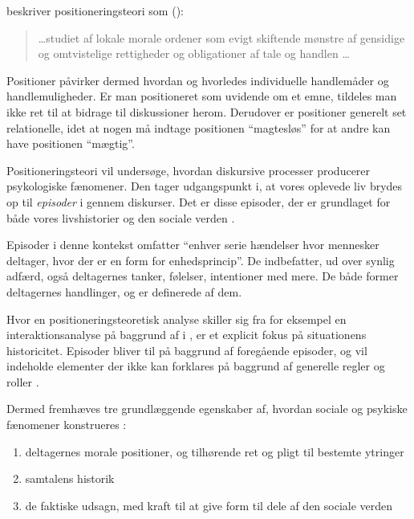\citeauthor{harreromPositioningTheoryMoral1999} beskriver 
positioneringsteori som (\citeyear[s.  1, min oversættelse
]{harreromPositioningTheoryMoral1999}):
\begin{quotation}
    \ldots studiet af lokale morale ordener som evigt skiftende 
    mønstre af gensidige og omtvistelige rettigheder og 
    obligationer af tale og handlen \ldots
\end{quotation}

Positioner påvirker dermed hvordan og hvorledes individuelle 
handlemåder og handlemuligheder. Er man positioneret som uvidende 
om et emne, tildeles man ikke ret til at bidrage til diskussioner 
herom. Derudover er positioner generelt set relationelle, idet at 
nogen må indtage positionen “magtesløs” for at andre kan have 
positionen “mægtig”.

Positioneringsteori vil undersøge, hvordan diskursive processer 
producerer psykologiske fænomener. Den tager udgangspunkt i, at 
vores oplevede liv brydes op til \emph{episoder} i gennem 
diskurser. Det er disse episoder, der er grundlaget for både vores 
livshistorier og den sociale verden \autocite[s.  
4]{harreromPositioningTheoryMoral1999}.

Episoder i denne kontekst omfatter “enhver serie hændelser hvor 
mennesker deltager, hvor der er en form for enhedsprincip”. De 
indbefatter, ud over synlig adfærd, også deltagernes tanker, 
følelser, intentioner med mere. De både former deltagernes 
handlinger, og er definerede af dem.

Hvor en positioneringsteoretisk analyse skiller sig fra for 
eksempel en interaktionsanalyse på baggrund af 
\citeauthor{goffmanPresentationSelfEveryday1956} i
, er et explicit 
fokus på situationens historicitet. Episoder bliver til på 
baggrund af foregående episoder, og vil  indeholde elementer der 
ikke kan forklares på baggrund af generelle regler og roller 
\autocite[s. 5-6]{harreromPositioningTheoryMoral1999}.

Dermed fremhæves tre grundlæggende egenskaber af, hvordan sociale 
og psykiske fænomener konstrueres 
\autocite{harreromPositioningTheoryMoral1999}:
\begin{enumerate}
    \item
        deltagernes morale positioner, og tilhørende ret og pligt 
        til bestemte ytringer
    \item
        samtalens historik
    \item
        de faktiske udsagn, med kraft til at give form til dele af 
        den sociale verden
\end{enumerate}

